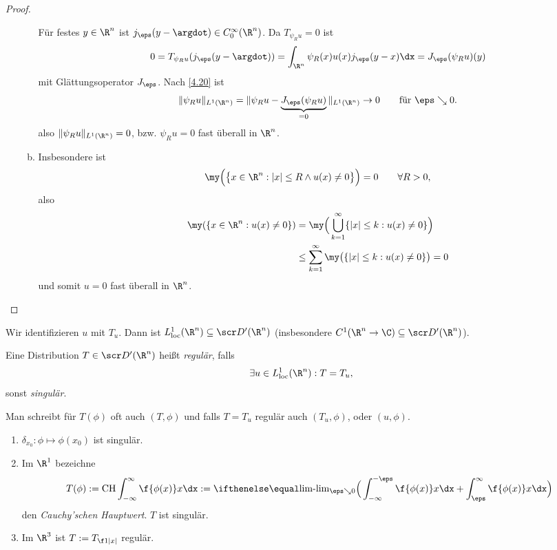 \begin{st}
\begin{proof}
\begin{enumerate}[1)]
\begin{enumerate}[a)]
						Für festes $y\in \R^n$ ist $j_\eps(y-\argdot) \in C_0^\infty(\R^n)$.
						Da $T_{\psi_R u} = 0$ ist
						\[
							0 = T_{\psi_R u} (j_\eps(y-\argdot))
							= \int_{\R^n} \psi_R(x) u(x) j_\eps(y-x) \dx
							= J_\eps(\psi_R u)(y)
						\]
						mit Glättungsoperator $J_\eps$.
						Nach \ref{4.20} ist
						\[
							\|\psi_R u \|_{L^1(\R^n)}
							= \|\psi_R u - \underbrace{J_\eps(\psi_R u)}_{=0} \|_{L^1(\R^n)}
							\to 0 \qquad \text{für $\eps \searrow 0$.}
						\]
						also $\|\psi_R u \|_{L^1(\R^n)} = 0$, bzw. $\psi_R u = 0$ fast überall in $\R^n$.
					\item
						Insbesondere ist
						\[
							\my \Big(\big\{ x \in \R^n : |x| \le R \land u(x) \neq 0 \big\} \Big) = 0
							\qquad \forall R > 0,
						\]
						also
						\begin{align*}
							\my(\{x\in \R^n : u(x) \neq 0\})
							&= \my \Big( \bigcup_{k=1}^\infty \{|x| \le k : u(x) \neq 0\} \Big) \\
							&\le \sum_{k=1}^\infty \my \big( \{|x|\le k : u(x)\neq 0\}\big)
							= 0
						\end{align*}
						und somit $u= 0$ fast überall in $\R^n$.
				\end{enumerate}
		\end{enumerate}
	\end{proof}
\end{st}

\begin{df} \label{5.8}
	Wir identifizieren $u$ mit $T_u$.
	Dann ist $L_{\text{loc}}^1 (\R^n) \subset \scr D'(\R^n)$ (insbesondere $C^1(\R^n \to \C) \subset \scr D'(\R^n)$).

	Eine Distribution $T \in \scr D'(\R^n)$ heißt \emph{regulär}, falls
	\[
		\exists u \in L_{\text{loc}}^1 (\R^n) : T = T_u,
	\]
	sonst \emph{singulär}.

	Man schreibt für $T(\phi)$ oft auch $(T,\phi)$ und falls $T = T_u$ regulär auch $(T_u, \phi)$, oder $(u, \phi)$.
\end{df}

\begin{ex} \label{5.9}
	\begin{enumerate}[1)]
		\item
			$\delta_{x_0} : \phi \mapsto \phi(x_0)$ ist singulär.
		\item
			Im $\R^1$ bezeichne
			\[
				T(\phi) 
				:= \CH \int_{-\infty}^\infty \f {\phi(x)}x \dx
				:= \lim_{\eps \searrow 0} \Big( \int_{-\infty}^{-\eps} \f{\phi(x)}x \dx + \int_{\eps}^\infty \f {\phi(x)}x \dx \Big)
			\]
			den \emph{Cauchy'schen Hauptwert}.
			$T$ ist singulär.
		\item
			Im $\R^3$ ist $T := T_{\f 1{|x|}}$ regulär.
	\end{enumerate}
\end{ex}

